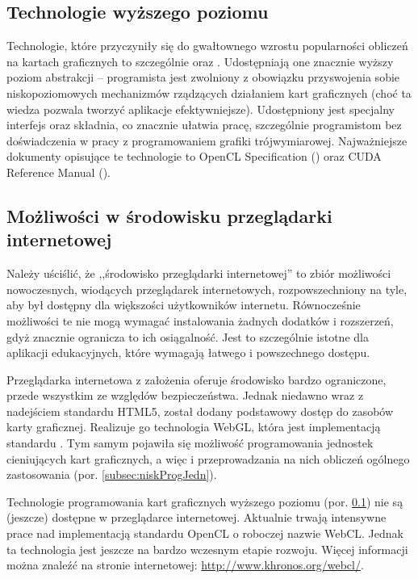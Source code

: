 \subsection{Technologie wyższego poziomu}
\label{subsec:techWyzPoz}

Technologie, które przyczyniły się do gwałtownego wzrostu popularności obliczeń
na kartach graficznych to szczególnie  oraz .
Udostępniają  one znacznie wyższy poziom abstrakcji -- programista jest
zwolniony z obowiązku przyswojenia sobie niskopoziomowych mechanizmów rządzących
działaniem kart graficznych (choć ta wiedza pozwala tworzyć aplikacje
efektywniejsze). Udostępniony jest specjalny interfejs oraz składnia, co
znacznie ułatwia pracę, szczególnie programistom bez doświadczenia w pracy z
programowaniem grafiki trójwymiarowej. Najważniejsze dokumenty opisujące te
technologie to OpenCL Specification (\cite{OpenCLSpec}) oraz 
CUDA Reference Manual (\cite{CUDARef}).

\subsection{Możliwości w środowisku przeglądarki internetowej}
\label{subsec:srodPrzegInt}

Należy uściślić, że ,,środowisko przeglądarki internetowej'' to zbiór
możliwości nowoczesnych, wiodących przeglądarek internetowych,
rozpowszechniony na tyle, aby był dostępny dla większości użytkowników
internetu. Równocześnie możliwości te nie mogą wymagać instalowania żadnych
dodatków i rozszerzeń, gdyż znacznie ogranicza to ich osiągalność. Jest to
szczególnie istotne dla aplikacji edukacyjnych, które wymagają łatwego i
powszechnego dostępu.

Przeglądarka internetowa z założenia oferuje środowisko bardzo ograniczone,
przede wszystkim ze względów bezpieczeństwa. Jednak niedawno wraz z
nadejściem standardu HTML5, został dodany podstawowy dostęp do zasobów karty
graficznej. Realizuje go technologia WebGL, która jest implementacją standardu
. Tym samym pojawiła się możliwość programowania jednostek
cieniujących kart graficznych, a więc i przeprowadzania na nich obliczeń
ogólnego zastosowania (por. \ref{subsec:niskProgJedn}).

Technologie programowania kart graficznych wyższego poziomu (por.
\ref{subsec:techWyzPoz}) nie są (jeszcze) dostępne w przeglądarce
internetowej. Aktualnie trwają intensywne prace nad implementacją standardu
OpenCL o roboczej nazwie WebCL. Jednak ta technologia jest jeszcze na bardzo
wczesnym etapie rozwoju. Więcej informacji można znaleźć na stronie
internetowej: \url{http://www.khronos.org/webcl/}.

